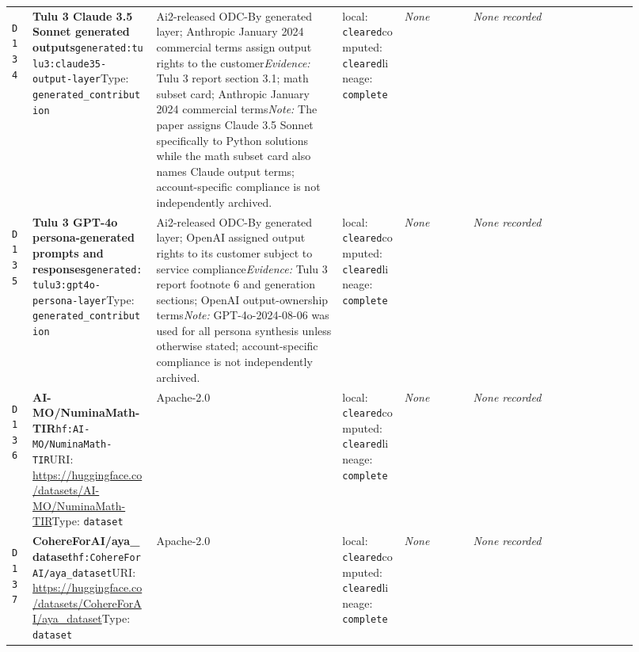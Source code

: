 \documentclass[9pt,a4paper]{article}
\newcommand{\depid}[1]{\hypertarget{dep:#1}{\texttt{#1}}}
\begin{document}
\begin{landscape}
\begin{longtable}{@{}L{0.035\linewidth}L{0.185\linewidth}L{0.27\linewidth}L{0.09\linewidth}L{0.10\linewidth}L{0.24\linewidth}@{}}
\depid{D134} & \textbf{Tulu 3 Claude 3.5 Sonnet generated outputs}\newline \nolinkurl{generated:tulu3:claude35-output-layer}\newline Type: \texttt{generated\_contribution} & Ai2-released ODC-By generated layer; Anthropic January 2024 commercial terms assign output rights to the customer\newline \textit{Evidence:} Tulu 3 report section 3.1; math subset card; Anthropic January 2024 commercial terms\newline \textit{Note:} The paper assigns Claude 3.5 Sonnet specifically to Python solutions while the math subset card also names Claude output terms; account-specific compliance is not independently archived. & local: \texttt{cleared}\newline computed: \texttt{cleared}\newline lineage: \texttt{complete} & \textit{None} & \textit{None recorded} \\
\depid{D135} & \textbf{Tulu 3 GPT-4o persona-generated prompts and responses}\newline \nolinkurl{generated:tulu3:gpt4o-persona-layer}\newline Type: \texttt{generated\_contribution} & Ai2-released ODC-By generated layer; OpenAI assigned output rights to its customer subject to service compliance\newline \textit{Evidence:} Tulu 3 report footnote 6 and generation sections; OpenAI output-ownership terms\newline \textit{Note:} GPT-4o-2024-08-06 was used for all persona synthesis unless otherwise stated; account-specific compliance is not independently archived. & local: \texttt{cleared}\newline computed: \texttt{cleared}\newline lineage: \texttt{complete} & \textit{None} & \textit{None recorded} \\
\depid{D136} & \textbf{AI-MO/NuminaMath-TIR}\newline \nolinkurl{hf:AI-MO/NuminaMath-TIR}\newline URI: \url{https://huggingface.co/datasets/AI-MO/NuminaMath-TIR}\newline Type: \texttt{dataset} & Apache-2.0 & local: \texttt{cleared}\newline computed: \texttt{cleared}\newline lineage: \texttt{complete} & \textit{None} & \textit{None recorded} \\
\depid{D137} & \textbf{CohereForAI/aya\_dataset}\newline \nolinkurl{hf:CohereForAI/aya_dataset}\newline URI: \url{https://huggingface.co/datasets/CohereForAI/aya_dataset}\newline Type: \texttt{dataset} & Apache-2.0 & local: \texttt{cleared}\newline computed: \texttt{cleared}\newline lineage: \texttt{complete} & \textit{None} & \textit{None recorded} \\

\end{longtable}
\end{landscape}
\end{document}
